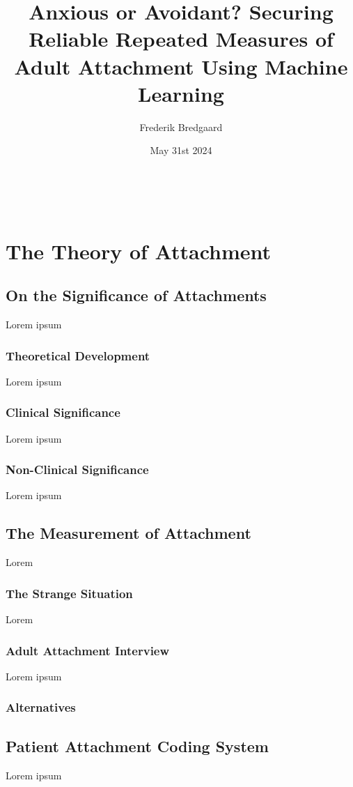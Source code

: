 \documentclass[12pt]{report}
\title{Anxious or Avoidant? Securing Reliable Repeated Measures of Adult Attachment Using Machine Learning}
\author{Frederik Bredgaard}
\date{May 31st 2024}
\begin{document}
\maketitle
\
\tableofcontents

\chapter{The Theory of Attachment}


\section{On the Significance of Attachments}
Lorem ipsum

\subsection{Theoretical Development}
Lorem ipsum

\subsection{Clinical Significance}
Lorem ipsum

\subsection{Non-Clinical Significance}
Lorem ipsum

\section{The Measurement of Attachment}
Lorem

\subsection{The Strange Situation}
Lorem

\subsection{Adult Attachment Interview}
Lorem ipsum

\subsection{Alternatives}

\section{Patient Attachment Coding System}
Lorem ipsum \cite{Talia2017,Talia2020}
\end{document}
